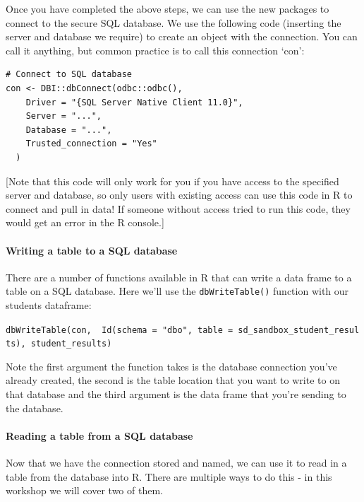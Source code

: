 \documentclass[
  12pt,
]{article}
\begin{document}
Once you have completed the above steps, we can use the new packages to
connect to the secure SQL database. We use the following code (inserting
the server and database we require) to create an object with the
connection. You can call it anything, but common practice is to call
this connection `con':

\begin{verbatim}
# Connect to SQL database
con <- DBI::dbConnect(odbc::odbc(),
    Driver = "{SQL Server Native Client 11.0}",
    Server = "...",
    Database = "...",
    Trusted_connection = "Yes"
  )
\end{verbatim}

{[}Note that this code will only work for you if you have access to the
specified server and database, so only users with existing access can
use this code in R to connect and pull in data! If someone without
access tried to run this code, they would get an error in the R
console.{]}

\hypertarget{writing-a-table-to-a-sql-database}{%
\paragraph{Writing a table to a SQL
database}\label{writing-a-table-to-a-sql-database}}

There are a number of functions available in R that can write a data
frame to a table on a SQL database. Here we'll use the
\texttt{dbWriteTable()} function with our students dataframe:

\texttt{dbWriteTable(con,\ \ Id(schema\ =\ "dbo",\ table\ =\ \textquotesingle{}sd\_sandbox\_student\_results\textquotesingle{}),\ student\_results)}

Note the first argument the function takes is the database connection
you've already created, the second is the table location that you want
to write to on that database and the third argument is the data frame
that you're sending to the database.

\hypertarget{reading-a-table-from-a-sql-database}{%
\paragraph{Reading a table from a SQL
database}\label{reading-a-table-from-a-sql-database}}

Now that we have the connection stored and named, we can use it to read
in a table from the database into R. There are multiple ways to do this
- in this workshop we will cover two of them.
\end{document}
